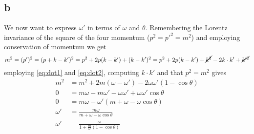 \documentclass[11pt, a4paper]{amsart}
\begin{document}
\subsection{b}
We now want to express $\omega'$ in terms of $\omega$ and $\theta$. Remembering the Lorentz invariance of the square of the four momentum ($p^2 = p'^2 = m^2$) and employing conservation of momentum we get
\begin{equation}
m^2 = (p')^2 = (p + k - k')^2 = p^2 + 2p(k-k') + (k -k')^2 = p^2 + 2p(k-k') + \cancel{k^2} - 2k\cdot k' + \cancel{k'^2}
\end{equation}
employing \autoref{eq:dot1} and \autoref{eq:dot2}, computing $k\cdot k'$ and that $p^2 = m^2$ gives
\begin{align}
  m^2 &= m^2 + 2m(\omega - \omega') - 2\omega\omega'(1 - \cos \theta) \nonumber \\
       0 &= m\omega -m\omega' - \omega\omega' + \omega\omega'\cos \theta \nonumber \\
       0 &=m\omega - \omega'(m + \omega - \omega\cos\theta) \nonumber \\
       \omega' &= \frac{m\omega}{m + \omega - \omega\cos\theta} \nonumber \\
       \omega' &= \frac{\omega}{1 + \frac{m}{\omega}(1-\cos\theta)}
\end{align}
\end{document}
